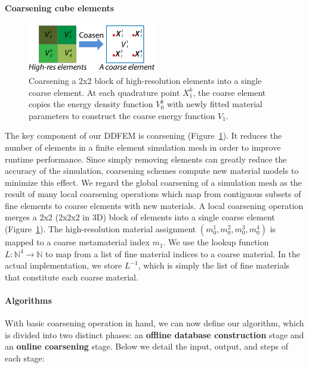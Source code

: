 \paragraph{Coarsening cube elements}
\begin{figure}[ht]
	\centering	
	\includegraphics[width=0.5\textwidth]{images/coarsen.pdf}
	\caption{Coarsening a 2x2 block of high-resolution elements into a single coarse element.
		At each quadrature point $X_1^k$, the coarse element copies the energy density function $V_0^k$ with newly fitted material parameters to construct the coarse energy function
		$V_1$.}
	\label{fig:coarsen}
\end{figure}
The key component of our DDFEM is coarsening (Figure~\ref{fig:coarsen}). It reduces the number of elements in a finite element simulation mesh in order to improve runtime performance. Since simply removing elements can greatly reduce the accuracy of the simulation, coarsening schemes compute new material models to minimize this effect.
We regard the global coarsening of a simulation mesh as the result of many local coarsening operations which map from contiguous subsets of fine elements to coarse elements with new materials.
A local coarsening operation merges a 2x2 (2x2x2 in 3D) block of elements into a single coarse element (Figure~\ref{fig:coarsen}).
The high-resolution material assignment $(m_0^1,m_0^2,m_0^3,m_0^4)$ is mapped to a coarse metamaterial index $m_1$. We use the lookup function $L:\mathbb{N}^4\rightarrow \mathbb{N}$ to map from a list of fine material indices to a coarse material. In the actual implementation, we store $L^{-1}$, which is simply the list of fine materials that constitute each coarse material.

\paragraph{Algorithms}
With basic coarsening operation in hand, we can now define our algorithm, which is divided into two distinct phases: an \textbf{offline database construction} stage and an \textbf{online coarsening} stage. Below we detail the input, output, and steps of each stage:


